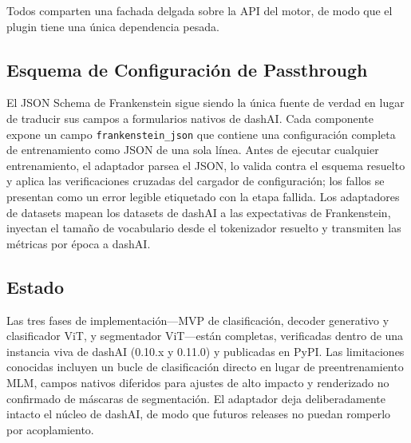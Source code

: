 Todos comparten una fachada delgada sobre la API del motor, de modo que el plugin tiene una única dependencia pesada.

\subsection{Esquema de Configuración de Passthrough}

El JSON Schema de Frankenstein sigue siendo la única fuente de verdad en lugar de traducir sus campos a formularios nativos de dashAI. Cada componente expone un campo \texttt{frankenstein\_json} que contiene una configuración completa de entrenamiento como JSON de una sola línea. Antes de ejecutar cualquier entrenamiento, el adaptador parsea el JSON, lo valida contra el esquema resuelto y aplica las verificaciones cruzadas del cargador de configuración; los fallos se presentan como un error legible etiquetado con la etapa fallida. Los adaptadores de datasets mapean los datasets de dashAI a las expectativas de Frankenstein, inyectan el tamaño de vocabulario desde el tokenizador resuelto y transmiten las métricas por época a dashAI.

\subsection{Estado}

Las tres fases de implementación---MVP de clasificación, decoder generativo y clasificador ViT, y segmentador ViT---están completas, verificadas dentro de una instancia viva de dashAI (0.10.x y 0.11.0) y publicadas en PyPI. Las limitaciones conocidas incluyen un bucle de clasificación directo en lugar de preentrenamiento MLM, campos nativos diferidos para ajustes de alto impacto y renderizado no confirmado de máscaras de segmentación. El adaptador deja deliberadamente intacto el núcleo de dashAI, de modo que futuros releases no puedan romperlo por acoplamiento.
